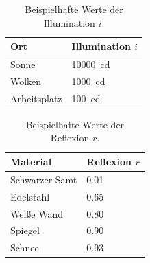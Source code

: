 				\begin{table}
					\centering
					\begin{tabular}{l|l}
						Ort          & Illumination \(i\)   \\ \hline
						Sonne        & \SI{10000}{\candela} \\
						Wolken       & \SI{1000}{\candela}  \\
						Arbeitsplatz & \SI{100}{\candela}
					\end{tabular}
					\caption{Beispielhafte Werte der Illumination \(i\).}
					\label{tab:exampleillumination}
				\end{table}
				\begin{table}
					\centering
					\begin{tabular}{l|l}
						Material       & Reflexion \(r\) \\ \hline
						Schwarzer Samt & \num{0.01}      \\
						Edelstahl      & \num{0.65}      \\
						Weiße Wand     & \num{0.80}      \\
						Spiegel        & \num{0.90}      \\
						Schnee         & \num{0.93}
					\end{tabular}
					\caption{Beispielhafte Werte der Reflexion \(r\).}
					\label{tab:examplereflexion}
				\end{table}
			
